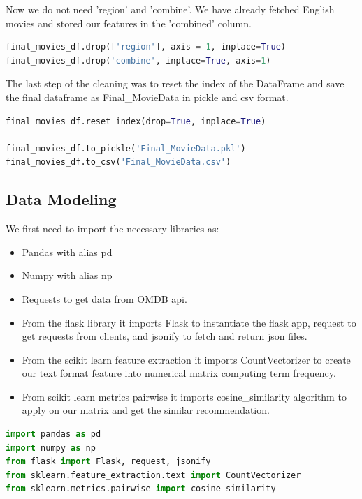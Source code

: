 Now we do not need 'region' and 'combine'. We have already fetched English movies and stored our features in the 'combined' column. 

\begin{lstlisting}[language=python]
final_movies_df.drop(['region'], axis = 1, inplace=True) 
final_movies_df.drop('combine', inplace=True, axis=1)
\end{lstlisting}

The last step of the cleaning was to reset the index of the DataFrame and save the final dataframe as Final\_MovieData in pickle and csv format.

\begin{lstlisting}[language=python]
final_movies_df.reset_index(drop=True, inplace=True)

final_movies_df.to_pickle('Final_MovieData.pkl')
final_movies_df.to_csv('Final_MovieData.csv')
\end{lstlisting}


\subsection{Data Modeling}

We first need to import the necessary libraries as:
\begin{itemize}
\item Pandas with alias pd
\item Numpy with alias np
\item Requests to get data from OMDB api.
\item From the flask library it imports Flask to instantiate the flask app,  request to get requests from clients, and jsonify to fetch and return json files.
\item From the scikit learn feature extraction it imports CountVectorizer to create our text format feature into numerical matrix computing term frequency.
\item From scikit learn metrics pairwise it imports cosine\_similarity algorithm to apply on our matrix and get the similar recommendation.
\end{itemize}


\begin{lstlisting}[language=python]
import pandas as pd
import numpy as np
from flask import Flask, request, jsonify
from sklearn.feature_extraction.text import CountVectorizer
from sklearn.metrics.pairwise import cosine_similarity
\end{lstlisting}

